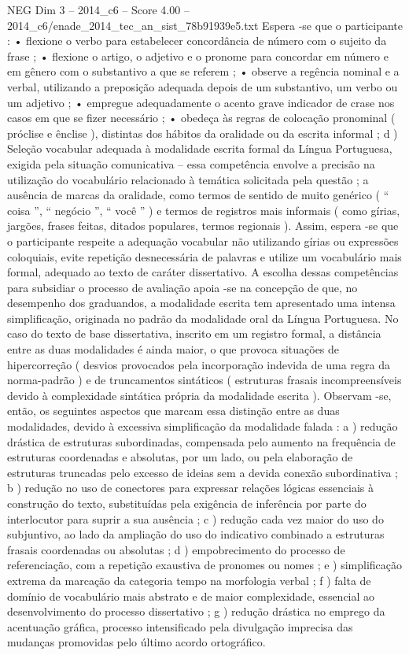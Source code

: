 \begin{textsample}{NEG Dim 3 – 2014\_c6 – Score 4.00 – 2014\_c6/enade\_2014\_tec\_an\_sist\_78b91939e5.txt}
Espera -se que o participante : • flexione o verbo para estabelecer concordância de número com o sujeito da frase ; • flexione o artigo, o adjetivo e o pronome para concordar em número e em gênero com o substantivo a que se referem ; • observe a regência nominal e a verbal, utilizando a preposição adequada depois de um substantivo, um verbo ou um adjetivo ; • empregue adequadamente o acento grave indicador de crase nos casos em que se fizer necessário ; • obedeça às regras de colocação pronominal ( próclise e ênclise ), distintas dos hábitos da oralidade ou da escrita informal ; d ) Seleção vocabular adequada à modalidade escrita formal da Língua Portuguesa, exigida pela situação comunicativa – essa competência envolve a precisão na utilização do vocabulário relacionado à temática solicitada pela questão ; a ausência de marcas da oralidade, como termos de sentido de muito genérico ( “ coisa ”, “ negócio ”, “ você ” ) e termos de registros mais informais ( como gírias, jargões, frases feitas, ditados populares, termos regionais ).
Assim, espera -se que o participante respeite a adequação vocabular não utilizando gírias ou expressões coloquiais, evite repetição desnecessária de palavras e utilize um vocabulário mais formal, adequado ao texto de caráter dissertativo.
A escolha dessas competências para subsidiar o processo de avaliação apoia -se na concepção de que, no desempenho dos graduandos, a modalidade escrita tem apresentado uma intensa simplificação, originada no padrão da modalidade oral da Língua Portuguesa.
No caso do texto de base dissertativa, inscrito em um registro formal, a distância entre as duas modalidades é ainda maior, o que provoca situações de hipercorreção ( desvios provocados pela incorporação indevida de uma regra da norma-padrão ) e de truncamentos sintáticos ( estruturas frasais incompreensíveis devido à complexidade sintática própria da modalidade escrita ).
Observam -se, então, os seguintes aspectos que marcam essa distinção entre as duas modalidades, devido à excessiva simplificação da modalidade falada : a ) redução drástica de estruturas subordinadas, compensada pelo aumento na frequência de estruturas coordenadas e absolutas, por um lado, ou pela elaboração de estruturas truncadas pelo excesso de ideias sem a devida conexão subordinativa ; b ) redução no uso de conectores para expressar relações lógicas essenciais à construção do texto, substituídas pela exigência de inferência por parte do interlocutor para suprir a sua ausência ; c ) redução cada vez maior do uso do subjuntivo, ao lado da ampliação do uso do indicativo combinado a estruturas frasais coordenadas ou absolutas ; d ) empobrecimento do processo de referenciação, com a repetição exaustiva de pronomes ou nomes ; e ) simplificação extrema da marcação da categoria tempo na morfologia verbal ; f ) falta de domínio de vocabulário mais abstrato e de maior complexidade, essencial ao desenvolvimento do processo dissertativo ; g ) redução drástica no emprego da acentuação gráfica, processo intensificado pela divulgação imprecisa das mudanças promovidas pelo último acordo ortográfico.

\end{textsample}
